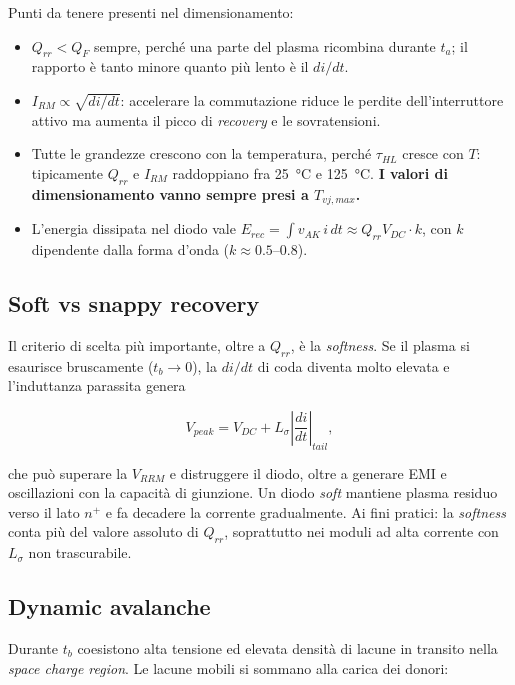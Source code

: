 Punti da tenere presenti nel dimensionamento:

\begin{itemize}
\item $Q_{rr} < Q_F$ sempre, perché una parte del plasma ricombina durante
$t_a$; il rapporto è tanto minore quanto più lento è il $di/dt$.
\item $I_{RM} \propto \sqrt{di/dt}$: accelerare la commutazione riduce le
perdite dell'interruttore attivo ma aumenta il picco di \emph{recovery} e le
sovratensioni.
\item Tutte le grandezze crescono con la temperatura, perché $\tau_{HL}$ cresce
con $T$: tipicamente $Q_{rr}$ e $I_{RM}$ raddoppiano fra \SI{25}{\celsius} e
\SI{125}{\celsius}. \textbf{I valori di dimensionamento vanno sempre presi a
$T_{vj,max}$.}
\item L'energia dissipata nel diodo vale
$E_{rec} = \int v_{AK}\, i\, dt \approx Q_{rr} V_{DC} \cdot k$, con $k$ dipendente
dalla forma d'onda ($k \approx 0.5$--$0.8$).
\end{itemize}

\subsection{Soft vs snappy recovery}

Il criterio di scelta più importante, oltre a $Q_{rr}$, è la \emph{softness}. Se
il plasma si esaurisce bruscamente ($t_b \to 0$), la $di/dt$ di coda diventa
molto elevata e l'induttanza parassita genera

\begin{equation}
V_{peak} = V_{DC} + L_{\sigma} \left|\frac{di}{dt}\right|_{tail},
\end{equation}

che può superare la $V_{RRM}$ e distruggere il diodo, oltre a generare EMI e
oscillazioni con la capacità di giunzione. Un diodo \emph{soft} mantiene
plasma residuo verso il lato $n^{+}$ e fa decadere la corrente gradualmente.
Ai fini pratici: la \emph{softness} conta più del valore assoluto di $Q_{rr}$,
soprattutto nei moduli ad alta corrente con $L_\sigma$ non trascurabile.

\subsection{Dynamic avalanche}

Durante $t_b$ coesistono alta tensione ed elevata densità di lacune in transito
nella \emph{space charge region}. Le lacune mobili si sommano alla carica dei
donori:

